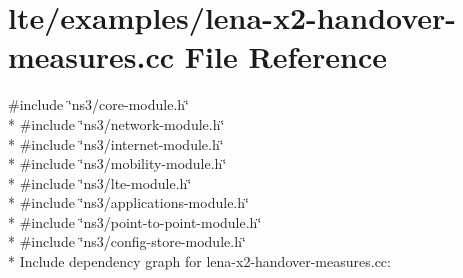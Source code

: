 \hypertarget{lena-x2-handover-measures_8cc}{}\section{lte/examples/lena-\/x2-\/handover-\/measures.cc File Reference}
\label{lena-x2-handover-measures_8cc}
{\ttfamily \#include \char`\"{}ns3/core-\/module.\+h\char`\"{}}\\*
{\ttfamily \#include \char`\"{}ns3/network-\/module.\+h\char`\"{}}\\*
{\ttfamily \#include \char`\"{}ns3/internet-\/module.\+h\char`\"{}}\\*
{\ttfamily \#include \char`\"{}ns3/mobility-\/module.\+h\char`\"{}}\\*
{\ttfamily \#include \char`\"{}ns3/lte-\/module.\+h\char`\"{}}\\*
{\ttfamily \#include \char`\"{}ns3/applications-\/module.\+h\char`\"{}}\\*
{\ttfamily \#include \char`\"{}ns3/point-\/to-\/point-\/module.\+h\char`\"{}}\\*
{\ttfamily \#include \char`\"{}ns3/config-\/store-\/module.\+h\char`\"{}}\\*
Include dependency graph for lena-\/x2-\/handover-\/measures.cc\+:
